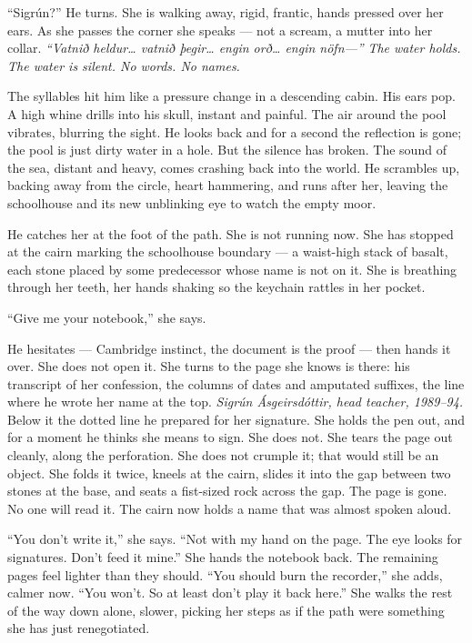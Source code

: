 \documentclass[11pt,oneside]{book}
\begin{document}
``Sigrún?'' He turns. She is walking away, rigid, frantic, hands pressed
over her ears. As she passes the corner she speaks --- not a scream, a
mutter into her collar. \emph{``Vatnið heldur\ldots{} vatnið
þegir\ldots{} engin orð\ldots{} engin nöfn---''} \emph{The water holds.
The water is silent. No words. No names.}

The syllables hit him like a pressure change in a descending cabin. His
ears pop. A high whine drills into his skull, instant and painful. The
air around the pool vibrates, blurring the sight. He looks back and for
a second the reflection is gone; the pool is just dirty water in a hole.
But the silence has broken. The sound of the sea, distant and heavy,
comes crashing back into the world. He scrambles up, backing away from
the circle, heart hammering, and runs after her, leaving the schoolhouse
and its new unblinking eye to watch the empty moor.

He catches her at the foot of the path. She is not running now. She has
stopped at the cairn marking the schoolhouse boundary --- a waist-high
stack of basalt, each stone placed by some predecessor whose name is not
on it. She is breathing through her teeth, her hands shaking so the
keychain rattles in her pocket.

``Give me your notebook,'' she says.

He hesitates --- Cambridge instinct, the document is the proof --- then
hands it over. She does not open it. She turns to the page she knows is
there: his transcript of her confession, the columns of dates and
amputated suffixes, the line where he wrote her name at the top.
\emph{Sigrún Ásgeirsdóttir, head teacher, 1989--94.} Below it the dotted
line he prepared for her signature. She holds the pen out, and for a
moment he thinks she means to sign. She does not. She tears the page out
cleanly, along the perforation. She does not crumple it; that would
still be an object. She folds it twice, kneels at the cairn, slides it
into the gap between two stones at the base, and seats a fist-sized rock
across the gap. The page is gone. No one will read it. The cairn now
holds a name that was almost spoken aloud.

``You don't write it,'' she says. ``Not with my hand on the page. The
eye looks for signatures. Don't feed it mine.'' She hands the notebook
back. The remaining pages feel lighter than they should. ``You should
burn the recorder,'' she adds, calmer now. ``You won't. So at least
don't play it back here.'' She walks the rest of the way down alone,
slower, picking her steps as if the path were something she has just
renegotiated.
\end{document}
